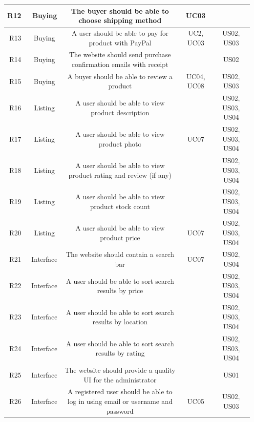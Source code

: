\documentclass[11pt]{article}
\newcounter{use case ID}
\begin{document}
\begin{table}[H]
\begin{adjustbox}{width=\columnwidth,center}
\begin{tabular}{|r | c| c | c| c|}
                R12 & \ Buying & The \index{buyer}buyer should be able to choose shipping method & UC03 &  \\
                \hline
                R13 & \ Buying & A user should be able to pay for \index{product}product with \index{PayPal}PayPal & UC2, UC03 & US02, US03 \\
                \hline
                R14 & \ Buying & The website should send purchase confirmation emails with \index{receipt}receipt & & US02 \\
                \hline
                R15 & \ Buying & A \index{buyer}buyer should be able to \index{review}review a product & UC04, UC08 & US02, US03 \\
                \hline
                R16 & \ Listing & A user should be able to view \index{product}product description & & US02, US03, US04 \\
                \hline
                R17 & \ Listing & A user should be able to view product photo & UC07 & US02, US03, US04 \\
                \hline
                R18 & \ Listing & A user should be able to view product rating and review (if any) & & US02, US03, US04 \\
                \hline
                R19 & \ Listing & A user should be able to view product stock count & & US02, US03, US04 \\
                \hline
                R20 & \ Listing & A user should be able to view \index{product}product price & UC07 & US02, US03, US04 \\
                    \hline
                R21 & \ Interface & The website should contain a search bar & UC07 & US02, US04 \\
                \hline
                R22 & \ Interface & A user should be able to sort search results by price  & & US02, US03, US04 \\
                \hline
                R23 & \ Interface & A user should be able to sort search results by location  & & US02, US03, US04 \\
                \hline
                R24 & \ Interface & A user should be able to sort search results by rating  & & US02, US03, US04 \\
                \hline
                R25 & \ Interface & The website should provide a quality UI for the \index{administrator}administrator & & US01 \\
                \hline
                R26 & \ Interface & A \index{registered user}registered user should be able to log in using email or username and password & UC05 & US02, US03 \\

\end{tabular}
\end{adjustbox}
\end{table}
\end{document}

